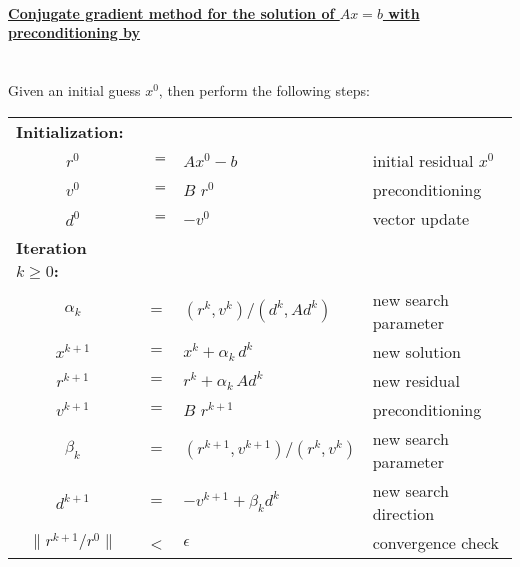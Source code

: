 \paragraph{\underline{Conjugate gradient method for the solution of $Ax=b$ with preconditioning by {}}} \mbox{} \\[1ex]
Given an initial guess $x^0$, then perform the following steps: \\[2ex]
\begin{tabular}{ccll}
%
\multicolumn{1}{l}{\bf Initialization:}&&&\\[1ex]
\hspace{1.0cm} $r^0$ & $\hspace{0.2cm}=$ & $A x^0-b$      & \hspace{1.0cm} initial residual $x^0$      \\[1.0ex]
\hspace{1.0cm} $v^0$ & $\hspace{0.2cm}=$ & $B\,\, r^0$  & \hspace{1.0cm} preconditioning  \\[1.0ex]
\hspace{1.0cm} $d^0$     & $\hspace{0.2cm}=$ & $-v^0$          & \hspace{1.0cm} vector update 	     \\[2.0ex]
%
 \multicolumn{1}{l}{\bf Iteration \boldmath $k\geq 0$:}&&&\\[1ex]
\hspace{1.0cm}$\alpha_k$ & $=$ & $(r^k, v^k)/(d^k, A d^k)$     & \hspace{1.0cm} new search parameter		     \\[1.0ex]
\hspace{1.0cm}$x^{k+1}$     & $=$ & $x^k + \alpha_k \,d^k$          & \hspace{1.0cm} new solution	   \\[1.0ex]
\hspace{1.0cm}$r^{k+1}$  & $=$ & $r^k + \alpha_k \,A d^k$      & \hspace{1.0cm} new residual		     \\[1.0ex]
\hspace{1.0cm}$v^{k+1}$  & $=$ & ${B\,\, r^{k+1}}$        & \hspace{1.0cm} preconditioning     \\[1.0ex]
\hspace{1.0cm}$\beta_k$  & $=$ & $(r^{k+1}, v^{k+1})/(r^k,v^k)$   & \hspace{1.0cm} new search parameter	  \\[1.0ex]
\hspace{1.0cm}$d^{k+1}$  & $=$ & $- v^{k+1} + \beta_k d^k$      &\hspace{1.0cm} new search direction    \\[1.0ex]
\hspace{1.0cm}$\| r^{k+1}/r^0 \|$ & < &$\epsilon$ 			& \hspace{1.0cm} convergence check			\\[1.5ex]
\end{tabular}

